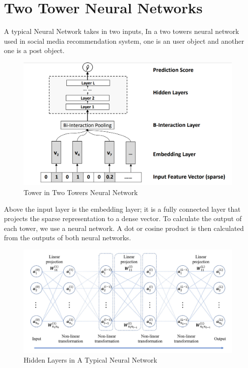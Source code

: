 \section{Two Tower Neural Networks} \label{nn}
A typical Neural Network takes in two inputs, In a two towers neural network used in social media recommendation system, one is an user object and another one is a post object.

\begin{figure}[H]
    \centering
    \includegraphics[width=1\linewidth]{Images/single-tower.png}
    \caption{Tower in Two Towers Neural Network \cite{10.1145/3038912.3052569}}
    \label{fig:collaborative-filtering-diagram}
\end{figure}

Above the input layer is the embedding layer; it is a fully
connected layer that projects the sparse representation to
a dense vector.  \cite{10.1145/3038912.3052569} \cite{DBLP:journals/corr/abs-1708-05027} To calculate the output of each tower, we use a neural network. A dot or cosine product is then calculated from the outputs of both neural networks.

\begin{figure}[H]
    \centering
    \includegraphics[width=1\linewidth]{Images/neural-network.png}
    \caption{Hidden Layers in A Typical Neural Network \cite{GAO2020409}}
    \label{fig:collaborative-filtering-diagram}
\end{figure}

